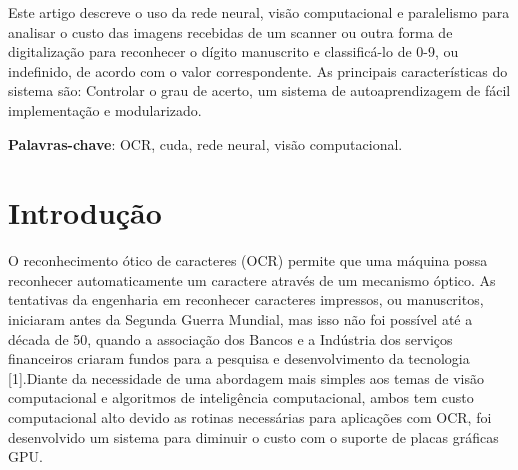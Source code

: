 \documentclass[
	article,			%
	11pt,				%
	oneside,			%
	a4paper,			%
	english,			%
	brazil,				%
	sumario=tradicional
	]{abntex2}
\begin{document}
\frenchspacing 


%
%
\maketitle

\begin{resumoumacoluna}
Este artigo descreve o uso da rede neural, visão computacional e  paralelismo
para analisar o custo  das imagens recebidas de um scanner ou outra forma de
digitalização para reconhecer o dígito manuscrito e classificá-lo de 0-9, ou
indefinido, de acordo com o valor correspondente. As principais características
do sistema são: Controlar o grau de acerto, um sistema de autoaprendizagem de
fácil implementação e modularizado.
 
 \vspace{\onelineskip}
 
 \noindent
 \textbf{Palavras-chave}: OCR, cuda, rede neural, visão computacional.
\end{resumoumacoluna}


\section*{Introdução}

O reconhecimento ótico de caracteres (OCR) permite que uma máquina possa
reconhecer automaticamente um caractere através de um mecanismo óptico. As
tentativas da engenharia em reconhecer caracteres impressos, ou manuscritos,
iniciaram antes da Segunda Guerra Mundial, mas isso não foi possível até a
década de 50, quando a associação dos Bancos e a Indústria dos serviços
financeiros criaram fundos para a pesquisa e desenvolvimento da tecnologia
[1].Diante da necessidade de uma abordagem mais simples aos temas de visão
computacional e algoritmos de inteligência computacional, ambos tem custo
computacional alto devido as rotinas necessárias para aplicações com OCR, foi
desenvolvido um sistema para diminuir o custo com o suporte de placas gráficas
GPU.
\end{document}
